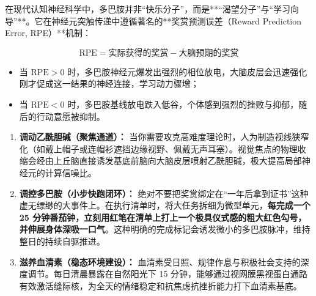 \documentclass[12pt,a4paper,openany]{ctexbook}
\begin{document}
在现代认知神经科学中，多巴胺并非“快乐分子”，而是**“渴望分子”与“学习向导”**。它在神经元突触传递中遵循著名的**奖赏预测误差（Reward Prediction Error, RPE）**机制：

\begin{equation}
\text{RPE} = \text{实际获得的奖赏} - \text{大脑预期的奖赏}
\end{equation}

\begin{itemize}
    \item 当 $\text{RPE} > 0$ 时，多巴胺神经元爆发出强烈的相位放电，大脑皮层会迅速强化刚才促成这一结果的神经连接，学习动力骤增；
    \item 当 $\text{RPE} < 0$ 时，多巴胺基线放电跌入低谷，个体感到强烈的挫败与抑郁，随后的行动意愿被抑制。
\end{itemize}

\begin{practicebox}[调控神经调质的动机黑客技术]
\begin{enumerate}
    \item \textbf{调动乙酰胆碱（聚焦通道）：}
    当你需要攻克高难度理论时，人为制造视线狭窄化（如戴上帽子或连帽衫遮挡边缘视野、佩戴无声耳塞）。视觉焦点的物理收缩会经由上丘脑直接诱发基底前脑向大脑皮层喷射乙酰胆碱，极大提高局部神经元的计算信噪比。
    
    \item \textbf{调控多巴胺（小步快跑闭环）：}
    绝对不要把奖赏绑定在“一年后拿到证书”这种虚无缥缈的大事件上。在执行清单时，将大任务拆细为微型单元，\textbf{每完成一个 25 分钟番茄钟，立刻用红笔在清单上打上一个极具仪式感的粗大红色勾号，并伸展身体深吸一口气}。这种明确的完成标记会诱发微小的多巴胺脉冲，维持整日的持续自驱推进。
    
    \item \textbf{滋养血清素（稳态环境建设）：}
    血清素受日照、规律作息与积极社会支持的深度调节。每日清晨暴露在自然阳光下 15 分钟，能够通过视网膜黑视蛋白通路有效激活缝际核，为全天的情绪稳定和抗焦虑抗挫折能力打下血清素基底。
\end{enumerate}
\end{practicebox}
\end{document}
